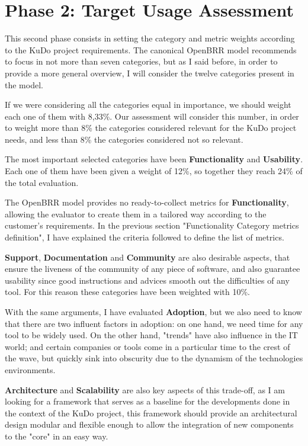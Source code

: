 \documentclass[a4paper,12pt]{book}
\begin{document}
\section{Phase 2: Target Usage Assessment}
\label{sec:phase2}
This second phase consists in setting the category and metric weights according to the KuDo project requirements. The canonical OpenBRR model recommends to focus in not more than seven categories, but as I said before, in order to provide a more general overview, I will consider the twelve categories present in the model.

If we were considering all the categories equal in importance, we should weight each one of them with 8,33\%. Our assessment will consider this number, in order to weight more than 8\% the categories considered relevant for the KuDo project needs, and less than 8\% the categories considered not so relevant.

The most important selected categories have been \textbf{Functionality} and \textbf{Usability}. Each one of them have been given a weight of 12\%, so together they reach 24\% of the total evaluation.

The OpenBRR model provides no ready-to-collect metrics for \textbf{Functionality}, allowing the evaluator to create them in a tailored way according to the customer's requirements. In the previous section "Functionality Category metrics definition", I have explained the criteria followed to define the list of metrics.

\textbf{Support}, \textbf{Documentation} and \textbf{Community} are also desirable aspects, that ensure the liveness of the community of any piece of software, and also guarantee usability since good instructions and advices smooth out the
difficulties of any tool. For this reason these categories have been
weighted with 10\%. 

With the same arguments, I have evaluated \textbf{Adoption}, but we also need to know that there are two influent factors in adoption: on one hand, we need time for any tool to be widely used. On the other hand, "trends" have also influence in the IT world; and certain
companies or tools come in a particular time to the crest of the wave, but quickly sink into obscurity due to the dynamism of the technologies environments. 

\textbf{Architecture}  and \textbf{Scalability} are also key aspects of this trade-off, as I am looking for a framework that serves as a baseline for the developments done in the context of the KuDo project, this framework should provide an architectural design modular and flexible enough to allow the integration of new components to the "core" in an easy way.
\end{document}
